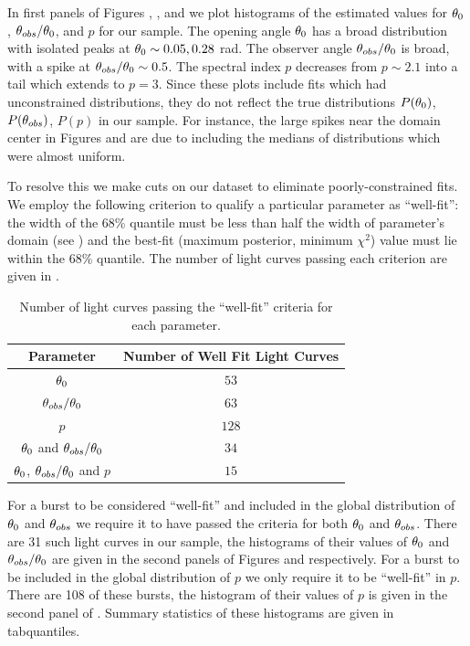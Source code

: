 In first panels of Figures , , and  we plot histograms of the estimated values for $\theta_0$, $\theta_{obs}/\theta_0$, and $p$ for our sample.  The opening angle $\theta_0$ has a broad distribution with isolated peaks at $\theta_0 \sim 0.05, 0.28$ rad.  The observer angle $\theta_{obs} / \theta_0$ is broad, with a spike at $\theta_{obs}/\theta_0 \sim 0.5$. The spectral index $p$ decreases from $p\sim 2.1$ into a tail which extends to $p=3$.  Since these plots include fits which had unconstrained distributions, they do not reflect the true distributions $P(\theta_0)$, $P(\theta_{obs})$, $P(p)$ in our sample.  For instance, the large spikes near the domain center in Figures  and  are due to including the medians of distributions which were almost uniform.   

To resolve this we make cuts on our dataset to eliminate poorly-constrained fits.  We employ the following criterion to qualify a particular parameter as ``well-fit'': the width of the 68\% quantile must be less than half the width of parameter's domain (see ) and the best-fit (maximum posterior, minimum $\chi^2$) value must lie within the 68\% quantile.  The number of light curves passing each criterion are given in .

\begin{table}
\begin{center}
\begin{tabular}{cc}
\hline \hline
Parameter & Number of Well Fit Light Curves \\
\hline
$\theta_0$ & $53$  \\
$\theta_{obs} / \theta_0$ & $63$ \\
$p $& $128$ \\
 $\theta_0$ and $\theta_{obs} / \theta_0$ & $ 34$ \\
$\theta_0$,  $\theta_{obs} / \theta_0$ and $p$ & $15$ \\
\hline
\end{tabular}
\caption{Number of light curves passing the ``well-fit'' criteria for each parameter.  }
\end{center}
\end{table}

For a burst to be considered ``well-fit'' and included in the global distribution of $\theta_0$ and $\theta_{obs}$ we require it to have passed the criteria for both $\theta_0$ and $\theta_{obs}$.  There are 31 such light curves in our sample, the histograms of their values of $\theta_0$ and $\theta_{obs} / \theta_0$ are given in the second panels of Figures  and  respectively.  For a burst to be included in the global distribution of $p$ we only require it to be ``well-fit'' in $p$.  There are 108 of these bursts, the histogram of their values of $p$ is given in the second panel of .  Summary statistics of these histograms are given in tab{quantiles}.

